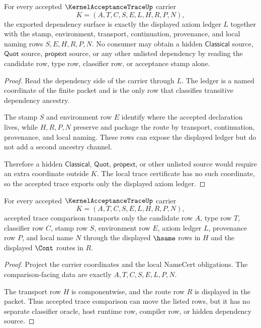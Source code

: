 \begin{theorem}
\label{thm:kernel-acceptance-trace-axiom-ledger-nonescape}
For every accepted $\KernelAcceptanceTraceUp$ carrier
$$
K=(A,T,C,S,E,L,H,R,P,N),
$$
the exported dependency surface is exactly the displayed axiom ledger $L$ together with the stamp, environment, transport, continuation, provenance, and local naming rows $S,E,H,R,P,N$. No consumer may obtain a hidden $\mathsf{Classical}$ source, $\mathsf{Quot}$ source, $\mathsf{propext}$ source, or any other unlisted dependency by reading the candidate row, type row, classifier row, or acceptance stamp alone.
\end{theorem}
\begin{proof}
Read the dependency side of the carrier through $L$. The ledger is a named coordinate of the finite packet and is the only row that classifies transitive dependency ancestry.

The stamp $S$ and environment row $E$ identify where the accepted declaration lives, while $H,R,P,N$ preserve and package the route by transport, continuation, provenance, and local naming. These rows can expose the displayed ledger but do not add a second ancestry channel.

Therefore a hidden $\mathsf{Classical}$, $\mathsf{Quot}$, $\mathsf{propext}$, or other unlisted source would require an extra coordinate outside $K$. The local trace certificate has no such coordinate, so the accepted trace exports only the displayed axiom ledger.
\end{proof}

\begin{theorem}
\label{thm:kernel-acceptance-trace-classifier-transport}
For every accepted $\KernelAcceptanceTraceUp$ carrier
$$
K=(A,T,C,S,E,L,H,R,P,N),
$$
accepted trace comparison transports only the candidate row $A$, type row $T$, classifier row $C$, stamp row $S$, environment row $E$, axiom ledger $L$, provenance row $P$, and local name $N$ through the displayed $\hsame$ rows in $H$ and the displayed $\Cont$ routes in $R$.
\end{theorem}
\begin{proof}
Project the carrier coordinates and the local NameCert obligations. The comparison-facing data are exactly $A,T,C,S,E,L,P,N$.

The transport row $H$ is componentwise, and the route row $R$ is displayed in the packet. Thus accepted trace comparison can move the listed rows, but it has no separate classifier oracle, host runtime row, compiler row, or hidden dependency source.
\end{proof}

